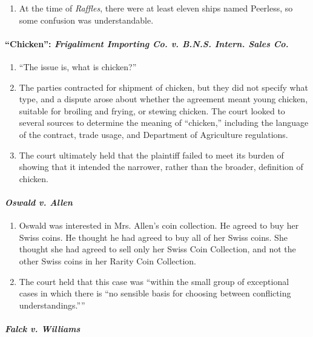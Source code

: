 \begin{enumerate}
    \item At the time of \emph{Raffles}, there were at least eleven ships 
    named Peerless, so some confusion was understandable.
\end{enumerate}

\paragraph{``Chicken'': \emph{Frigaliment Importing Co. v. B.N.S. Intern. 
Sales Co.}}

\begin{enumerate}
    \item ``The issue is, what is chicken?''
    \item The parties contracted for shipment of chicken, but they did not 
    specify what type, and a dispute arose about whether the agreement meant 
    young chicken, suitable for broiling and frying, or stewing chicken. The 
    court looked to several sources to determine the meaning of ``chicken,'' 
    including the language of the contract, trade usage, and Department of 
    Agriculture regulations.
    \item The court ultimately held that the plaintiff failed to meet its 
    burden of showing that it intended the narrower, rather than the broader, 
    definition of chicken.
\end{enumerate}

\paragraph{\emph{Oswald v. Allen}}

\begin{enumerate}
    \item Oswald was interested in Mrs. Allen's coin collection. He agreed to 
    buy her Swiss coins. He thought he had agreed to buy all of her Swiss 
    coins. She thought she had agreed to sell only her Swiss Coin Collection, 
    and not the other Swiss coins in her Rarity Coin Collection.
    \item The court held that this case was ``within the small group of 
    exceptional cases in which there is \enquote{no sensible basis for 
    choosing between conflicting understandings.}''
\end{enumerate}

\paragraph{\emph{Falck v. Williams}}

